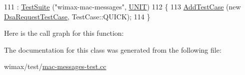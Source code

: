 \begin{DoxyCode}
111   : \hyperlink{classns3_1_1TestSuite_a904b0c40583b744d30908aeb94636d1a}{TestSuite} (\textcolor{stringliteral}{"wimax-mac-messages"}, \hyperlink{classns3_1_1TestSuite_a1ebfcab34ec8161e085e8e3a1855eae0a3885375a3787abf60431f8454b3cadbd}{UNIT})
112 \{
113   \hyperlink{classns3_1_1TestCase_a3718088e3eefd5d6454569d2e0ddd835}{AddTestCase} (\textcolor{keyword}{new} \hyperlink{classDsaRequestTestCase}{DsaRequestTestCase}, TestCase::QUICK);
114 \}
\end{DoxyCode}


Here is the call graph for this function\+:




The documentation for this class was generated from the following file\+:\begin{DoxyCompactItemize}
\item 
wimax/test/\hyperlink{mac-messages-test_8cc}{mac-\/messages-\/test.\+cc}\end{DoxyCompactItemize}
